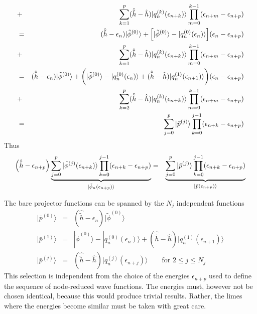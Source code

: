 \documentclass[11pt,a4paper]{report}
\begin{document}
\begin{eqnarray}
\nonumber\\
&+&\sum_{k=1}^{p}
(\hat{\tilde{h}}-\hat{h})
|q_n^{(k)}(\epsilon_{n+k})\rangle
\prod_{m=0}^{k-1}(\epsilon_{n+m}-\epsilon_{n+p})
\nonumber\\
&=&
(\hat{\tilde{h}}-\epsilon_{n})|\tilde{\phi}^{(0)}\rangle
+
\Bigl[|\tilde{\phi}^{(0)}\rangle-|q_n^{(0)}(\epsilon_{n})\rangle\Bigr]
(\epsilon_n-\epsilon_{n+p})
\nonumber\\
&+&\sum_{k=1}^{p}
(\hat{\tilde{h}}-\hat{h})
|q_n^{(k)}(\epsilon_{n+k})\rangle
\prod_{m=0}^{k-1}(\epsilon_{n+m}-\epsilon_{n+p})
\nonumber\\
&=&
(\hat{\tilde{h}}-\epsilon_{n})|\tilde{\phi}^{(0)}\rangle
+
\biggl(
|\tilde{\phi}^{(0)}\rangle-|q_n^{(0)}(\epsilon_{n})\rangle
+(\hat{\tilde{h}}-\hat{h})
|q_n^{(1)}(\epsilon_{n+1})\rangle\biggr)(\epsilon_n-\epsilon_{n+p})
\nonumber\\
&+&\sum_{k=2}^{p}
(\hat{\tilde{h}}-\hat{h})
|q_n^{(k)}(\epsilon_{n+k})\rangle
\prod_{m=0}^{k-1}(\epsilon_{n+m}-\epsilon_{n+p})
\nonumber\\
&=&\sum_{j=0}^{p}|\bar{p}^{(j)}\rangle
\prod_{k=0}^{j-1}(\epsilon_{n+k}-\epsilon_{n+p})
\end{eqnarray}
Thus
\begin{eqnarray}
\Bigl(\hat{\tilde{h}}-\epsilon_{n+p}\Bigr)
\underbrace{\sum_{j=0}^{p}|\tilde{\phi}^{(j)}(\epsilon_{n+k})\rangle
\prod_{k=0}^{j-1}(\epsilon_{n+k}-\epsilon_{n+p})}
_{|\tilde{\phi}_n(\epsilon_{n+p})\rangle}
&=&\underbrace{\sum_{j=0}^{p}|\bar{p}^{(j)}\rangle
\prod_{k=0}^{j-1}(\epsilon_{n+k}-\epsilon_{n+p})
}_{|\bar{p}(\epsilon_{n+p})\rangle}
\end{eqnarray}




The bare projector functions can be spanned by the $N_j$ independent functions
\begin{eqnarray}
|\bar{p}^{(0)}\rangle&=&(\hat{\tilde{h}}-\epsilon_{n})|\tilde{\phi}^{(0)}\rangle
\nonumber\\
|\bar{p}^{(1)}\rangle&=&|\tilde{\phi}^{(0)}\rangle-|q_n^{(0)}(\epsilon_n)\rangle
+(\hat{\tilde{h}}-\hat{h})
|q_n^{(1)}(\epsilon_{n+1})\rangle
\nonumber\\
|\bar{p}^{(j)}\rangle&=&(\hat{\tilde{h}}-\hat{h})|q_n^{(j)}(\epsilon_{n+j})\rangle
\qquad\text{for $2\le j\le N_j$}
\end{eqnarray}
This selection is independent from the choice of the energies
$\epsilon_{n+p}$ used to define the sequence of node-reduced wave
functions. The energies must, however not be chosen identical, because
this would produce trivial results. Rather, the limes where the
energies become similar must be taken with great care.
\end{document}
